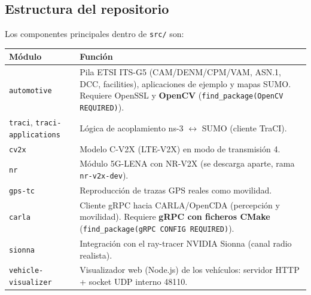 \documentclass[11pt,a4paper]{article}
\begin{document}
\subsection{Estructura del repositorio}

Los componentes principales dentro de \texttt{src/} son:

\begin{center}
\small
\begin{tabular}{@{}p{}p{}@{}}
\toprule
\textbf{M\'odulo} & \textbf{Funci\'on} \\
\midrule
\texttt{automotive} & Pila ETSI ITS-G5 (CAM/DENM/CPM/VAM, ASN.1, DCC,
facilities), aplicaciones de ejemplo y mapas SUMO. Requiere OpenSSL y
\textbf{OpenCV} (\texttt{find\_package(OpenCV REQUIRED)}). \\
\texttt{traci}, \texttt{traci-applications} & L\'ogica de acoplamiento
ns-3 $\leftrightarrow$ SUMO (cliente TraCI). \\
\texttt{cv2x} & Modelo C-V2X (LTE-V2X) en modo de transmisi\'on 4. \\
\texttt{nr} & M\'odulo 5G-LENA con NR-V2X (se descarga aparte, rama
\texttt{nr-v2x-dev}). \\
\texttt{gps-tc} & Reproducci\'on de trazas GPS reales como movilidad. \\
\texttt{carla} & Cliente gRPC hacia CARLA/OpenCDA (percepci\'on y
movilidad). Requiere \textbf{gRPC con ficheros CMake}
(\texttt{find\_package(gRPC CONFIG REQUIRED)}). \\
\texttt{sionna} & Integraci\'on con el ray-tracer NVIDIA Sionna
(canal radio realista). \\
\texttt{vehicle-visualizer} & Visualizador web (Node.js) de los
veh\'iculos: servidor HTTP + socket UDP interno 48110. \\
\bottomrule
\end{tabular}
\end{center}
\end{document}
